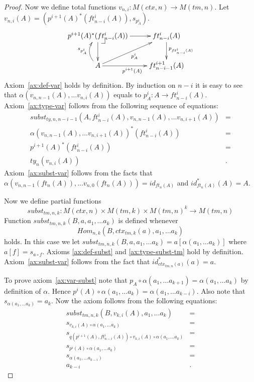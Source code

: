 \documentclass{elsarticle}
\makeatletter
\theoremstyle{definition}
\theoremstyle{remark}
\numberwithin{figure}{section}
\newcommand{\pb}[1][dr]{\save*!/#1-1.2pc/#1:(-1,1)@^{|-}\restore}
\makeatother
\begin{document}
\begin{proof}
Now we define total functions $v_{n,i} : M(ctx,n) \to M(tm,n)$.
Let $v_{n,i}(A) = (p^{i+1}(A)^*(ft^i_{n-i}(A)), s_{p^i_A})$.
\[ \xymatrix{ p^{i+1}(A)^*(ft^i_{n-i}(A)) \ar[r] \ar[d] \pb & ft^i_{n-i}(A) \ar[d]^{p_{ft^i_{n-i}(A)}} \\
              A \ar[r]_{p^{i+1}(A)} \ar@/^1pc/[u]^{s_{p^i_A}} \ar[ur]_{p^i_A} & ft^{i+1}_{n-i-1}(A)
            } \]
Axiom~\eqref{ax:def-var} holds by definition.
By induction on $n-i$ it is easy to see that $\alpha(v_{n,n-1}(A), \ldots v_{n,i}(A))$ equals to $p_A^i : A \to ft^i_{n-i}(A)$.
Axiom~\eqref{ax:type-var} follows from the following sequence of equations:
\begin{align*}
subst_{ty,n,n-i-1}(A, ft^i_{n-i}(A), v_{n,n-1}(A), \ldots v_{n,i+1}(A)) & = \\
\alpha(v_{n,n-1}(A), \ldots v_{n,i+1}(A))^*(ft^i_{n-i}(A)) & = \\
p^{i+1}(A)^*(ft^i_{n-i}(A)) & = \\
ty_n(v_{n,i}(A)) & .
\end{align*}
Axiom~\eqref{ax:subst-var} follows from the facts that $\alpha(v_{n,n-1}(ft_n(A)), \ldots v_{n,0}(ft_n(A))) = id_{ft_n(A)}$ and $id_{ft_n(A)}^*(A) = A$.

Now we define partial functions
\[ subst_{tm,n,k} : M(ctx,n) \times M(tm,k) \times M(tm,n)^k \to M(tm,n) \]
Function $subst_{tm,n,k}(B, a, a_1, \ldots a_k)$ is defined whenever \[ Hom_{n,k}(B, ctx_{tm,k}(a), a_1, \ldots a_k) \] holds.
In this case we let $subst_{tm,n,k}(B, a, a_1, \ldots a_k) = a[\alpha(a_1, \ldots a_k)]$ where $a[f] = s_{a \circ f}$.
Axioms \eqref{ax:def-subst} and \eqref{ax:type-subst-tm} hold by definition.
Axiom~\eqref{ax:subst-var} follows from the fact that $id_{ctx_{tm,n}(a)}^*(a) = a$.

To prove axiom~\eqref{ax:var-subst} note that $p_A \circ \alpha(a_1, \ldots a_{k+1}) = \alpha(a_1, \ldots a_k)$ by definition of $\alpha$.
Hence $p^i(A) \circ \alpha(a_1, \ldots a_k) = \alpha(a_1, \ldots a_{k-i})$.
Also note that $s_{\alpha(a_1, \ldots a_k)} = a_k$.
Now the axiom follows from the following equations:
\begin{align*}
subst_{tm,n,k}(B, v_{k,i}(A), a_1, \ldots a_k) & = \\
s_{v_{k,i}(A) \circ \alpha(a_1, \ldots a_k)} & = \\
s_{q(p^{i+1}(A), ft^i_{n-i}(A)) \circ v_{k,i}(A) \circ \alpha(a_1, \ldots a_k)} & = \\
s_{p^i(A) \circ \alpha(a_1, \ldots a_k)} & = \\
s_{\alpha(a_1, \ldots a_{k-i})} & = \\
a_{k-i} & .
\end{align*}


\end{proof}
\end{document}
